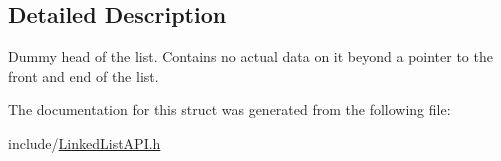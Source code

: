 \subsection{Detailed Description}
Dummy head of the list. Contains no actual data on it beyond a pointer to the front and end of the list. 

The documentation for this struct was generated from the following file\+:\begin{DoxyCompactItemize}
\item 
include/\hyperlink{LinkedListAPI_8h}{Linked\+List\+A\+P\+I.\+h}\end{DoxyCompactItemize}
